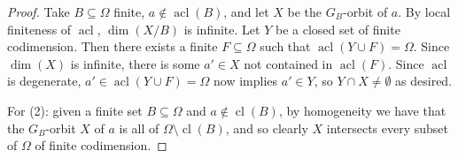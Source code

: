 \documentclass{article}
\theoremstyle{remark}
\theoremstyle{definition}
\DeclareMathOperator{\cl}{cl}
\DeclareMathOperator{\acl}{acl}
\def\Ind#1#2{#1\setbox0=\hbox{$#1x$}\kern\wd0\hbox to 0pt{\hss$#1\mid$\hss}
	\lower.9\ht0\hbox to 0pt{\hss$#1\smile$\hss}\kern\wd0}
\def\ind{\mathop{\mathpalette\Ind{}}}
\begin{document}
{\begin{proof}
{Take $B\subseteq\Omega$ 
finite, $a\notin \acl(B)$, and let $X$ be the $G_B$-orbit of $a$. By local finiteness {of $\acl$}, $\dim(X/B)$ is infinite. Let $Y$ be a closed set of finite codimension. Then there exists a finite $F\subseteq\Omega$ such that $\acl(Y\cup F)=\Omega$. Since $\dim(X)$ is infinite, there is some $a'\in X$ not contained in $\acl(F)$. Since $\acl$ is degenerate, $a'\in \acl(Y\cup F)=\Omega$ now implies $a'\in Y$, so $Y\cap X\neq\emptyset$ as desired.}

For (2): 
{given a finite set $B\subseteq \Omega$ and $a\notin{\cl}(B)$, by homogeneity  we have that the $G_B$-orbit $X$ of $a$  is all of $\Omega\setminus {\cl}(B)$, and so clearly $X$ intersects every subset of $\Omega$ of finite codimension.} 
\end{proof}




}
\end{document}
